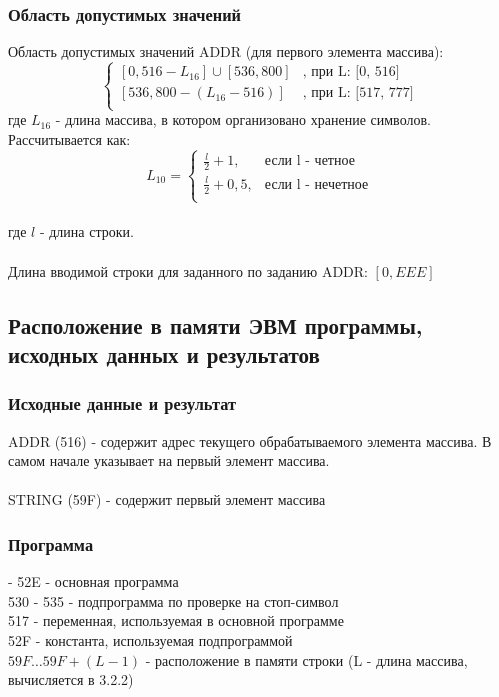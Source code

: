 \subsubsection{Область допустимых значений}
\noindent Область допустимых значений ADDR (для первого элемента массива):
\[
	\begin{cases}
		[0, 516 - L_{16}]\cup[536, 800] & \text{, при L: [0, 516]}\\
		[536, 800 - (L_{16} - 516)] & \text{, при L: [517, 777]}\\
	\end{cases}
\] 
где $ L_{16} $ - длина массива, в котором организовано хранение символов. Рассчитывается как: \[
L_{10} = \begin{cases}
		\frac{l}{2} + 1, & \text{если l - четное}\\
		\frac{l}{2} + 0,5, & \text{если l - нечетное}\\
\end{cases}
\]\\
где $ l $ - длина строки.\\
\\
Длина вводимой строки для заданного по заданию ADDR: $ [0, EEE] $

\subsection{Расположение в памяти ЭВМ программы, исходных данных и результатов}
\subsubsection{Исходные данные и результат}
\noindent ADDR (516) - содержит адрес текущего обрабатываемого элемента массива. В самом начале указывает на первый элемент массива.\\
\\
STRING (59F) - содержит первый элемент массива

\subsubsection{Программа}
 - 52E - основная программа\\
530 - 535 - подпрограмма по проверке на стоп-символ\\
517 - переменная, используемая в основной программе\\
52F - константа, используемая подпрограммой\\
$59F\ldots 59F + (L - 1)$ - расположение в памяти строки (L - длина массива, вычисляется в 3.2.2)

